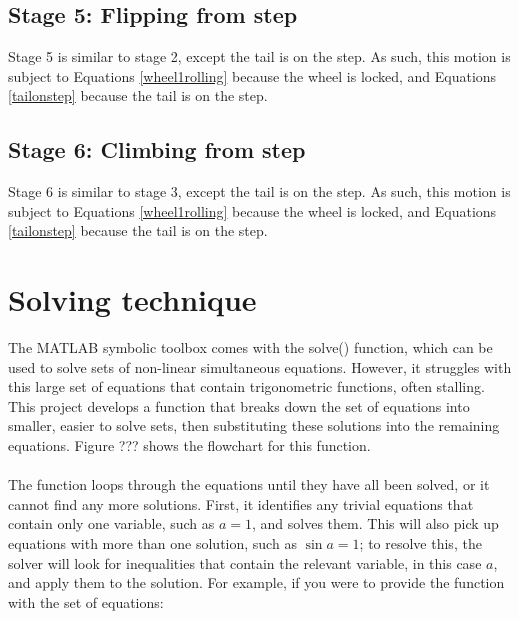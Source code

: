 \subsection*{Stage 5: Flipping from step}
Stage 5 is similar to stage 2, except the tail is on the step. As such, this motion is subject to Equations \ref{wheel1rolling} because the wheel is locked, and Equations \ref{tailonstep} because the tail is on the step.\\

\subsection*{Stage 6: Climbing from step}
Stage 6 is similar to stage 3, except the tail is on the step. As such, this motion is subject to Equations \ref{wheel1rolling} because the wheel is locked, and Equations \ref{tailonstep} because the tail is on the step.\\

\section{Solving technique}
The MATLAB symbolic toolbox comes with the solve() function, which can be used to solve sets of non-linear simultaneous equations. However, it struggles with this large set of equations that contain trigonometric functions, often stalling. This project develops a function that breaks down the set of equations into smaller, easier to solve sets, then substituting these solutions into the remaining equations. Figure ??? shows the flowchart for this function. \\
\\
The function loops through the equations until they have all been solved, or it cannot find any more solutions. First, it identifies any trivial equations that contain only one variable, such as $a = 1$, and solves them. This will also pick up equations with more than one solution, such as $\sin{a} = 1$; to resolve this, the solver will look for inequalities that contain the relevant variable, in this case $a$, and apply them to the solution. For example, if you were to provide the function with the set of equations:\\

